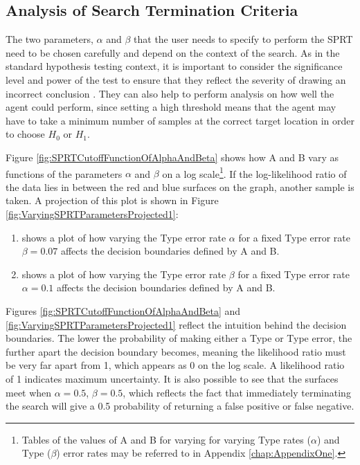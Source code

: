 \subsection{Analysis of Search Termination Criteria}
The two parameters, $\alpha$ and $\beta$ that the user needs to specify to perform the SPRT need to be chosen carefully and depend on the context of the search. As in the standard hypothesis testing context, it is important to consider the significance level and power of the test to ensure that they reflect the severity of drawing an incorrect conclusion \cite{IntroductionToMathematicalStatistics}. They can also help to perform analysis on how well the agent could perform, since setting a high threshold means that the agent may have to take a minimum number of samples at the correct target location in order to choose $H_0$ or $H_1$. \par

Figure \ref{fig:SPRTCutoffFunctionOfAlphaAndBeta} shows how A and B vary as functions of the parameters $\alpha$ and $\beta$ on a log scale\footnote{Tables of the values of A and B for varying for varying Type  rates ($\alpha$) and Type  ($\beta$) error rates may be referred to in Appendix \ref{chap:AppendixOne}.}. If the log-likelihood ratio of the data lies in between the red and blue surfaces on the graph, another sample is taken. A projection of this plot is shown in Figure \ref{fig:VaryingSPRTParametersProjected1}:
\begin{enumerate}[label=(\alph*)]
    \item shows a plot of how varying the Type  error rate $\alpha$ for a fixed Type error rate $\beta = 0.07$ affects the decision boundaries defined by A and B.
    \item shows a plot of how varying the Type error rate $\beta$ for a fixed Type error rate $\alpha = 0.1$ affects the decision boundaries defined by A and B.
\end{enumerate}

Figures \ref{fig:SPRTCutoffFunctionOfAlphaAndBeta} and \ref{fig:VaryingSPRTParametersProjected1} reflect the intuition behind the decision boundaries. The lower the probability of making either a Type  or Type  error, the further apart the decision boundary becomes, meaning the likelihood ratio must be very far apart from 1, which appears as 0 on the log scale. A likelihood ratio of 1 indicates maximum uncertainty. It is also possible to see that the surfaces meet when $\alpha=0.5$, $\beta=0.5$, which reflects the fact that immediately terminating the search will give a 0.5 probability of returning a false positive or false negative. \par

